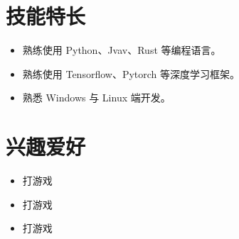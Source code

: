 \documentclass[11pt]{article}
\newlength{\iconwidth}
\begin{document}
    \begin{minipage}[t]{0.6\textwidth}
        \section[技能特长]{\makebox[\iconwidth][c]{\color{primary_color}{\faWrench}}\quad 技能特长}
        \begin{itemize}
        \setlength{\itemsep}{0.5em}
            \item 熟练使用 Python、Jvav、Rust 等编程语言。
            \item 熟练使用 Tensorflow、Pytorch 等深度学习框架。
            \item 熟悉 Windows 与 Linux 端开发。
        \end{itemize}
    \end{minipage}
    \hfill
    \begin{minipage}[t]{0.35\textwidth}
        \section[兴趣爱好]{\makebox[\iconwidth][c]{\color{primary_color}{\faStar}}\quad 兴趣爱好}
        \begin{itemize}
        \setlength{\itemsep}{0.5em}
            \item 打游戏
            \item 打游戏
            \item 打游戏
        \end{itemize}
    \end{minipage}
    

\end{document}
